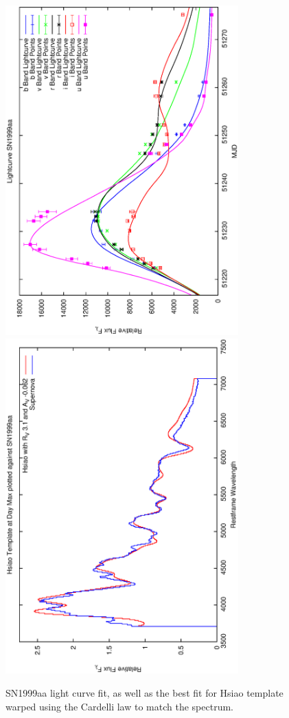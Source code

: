 \clearpage

\begin{figure}[p]
\centering
\includegraphics[angle=-90,width=0.8\textwidth]{./figures/ltcv/SN1999aa_v023_lightcurve.ps}
\hfill
\includegraphics[angle=-90,width=0.8\textwidth]{./figures/hsiao/SN1999aa_v001_hsiao.ps}
\hfill
\caption{SN1999aa light curve fit, as well as the best fit for Hsiao template warped using the Cardelli law to match the spectrum.}
\label{fig:SN1999aafour2}
\end{figure}


